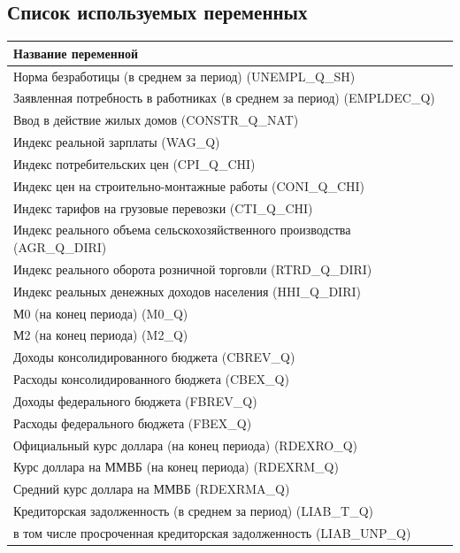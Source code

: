 \begin{appendices}
\chapter[]{Список используемых переменных}\label{app:list}



\begin{table}[ht]
\centering
\begin{tabular}{l}
  \hline
Название переменной \\ 
  \hline
Норма безработицы (в среднем за период)  (UNEMPL\_Q\_SH) \\ 
  Заявленная потребность в работниках (в среднем за период)  (EMPLDEC\_Q) \\ 
  Ввод в действие жилых домов  (CONSTR\_Q\_NAT) \\ 
  Индекс реальной зарплаты  (WAG\_Q) \\ 
  Индекс потребительских цен  (CPI\_Q\_CHI) \\ 
  Индекс цен на строительно-монтажные работы  (CONI\_Q\_CHI) \\ 
  Индекс тарифов на грузовые перевозки  (CTI\_Q\_CHI) \\ 
  Индекс реального объема сельскохозяйственного производства  (AGR\_Q\_DIRI) \\ 
  Индекс реального оборота розничной торговли  (RTRD\_Q\_DIRI) \\ 
  Индекс реальных денежных доходов населения  (HHI\_Q\_DIRI) \\ 
  М0 (на конец периода)  (M0\_Q) \\ 
  М2 (на конец периода)  (M2\_Q) \\ 
  Доходы консолидированного бюджета  (CBREV\_Q) \\ 
  Расходы консолидированного бюджета  (CBEX\_Q) \\ 
  Доходы федерального бюджета  (FBREV\_Q) \\ 
  Расходы федерального бюджета  (FBEX\_Q) \\ 
  Официальный курс доллара (на конец периода)  (RDEXRO\_Q) \\ 
  Курс доллара на ММВБ (на конец периода)  (RDEXRM\_Q) \\ 
  Средний курс доллара на ММВБ   (RDEXRMA\_Q) \\ 
  Кредиторская задолженность (в среднем за период)  (LIAB\_T\_Q) \\ 
  в том числе просроченная кредиторская задолженность  (LIAB\_UNP\_Q) \\ 

\end{tabular}
\end{table}
\end{appendices}
